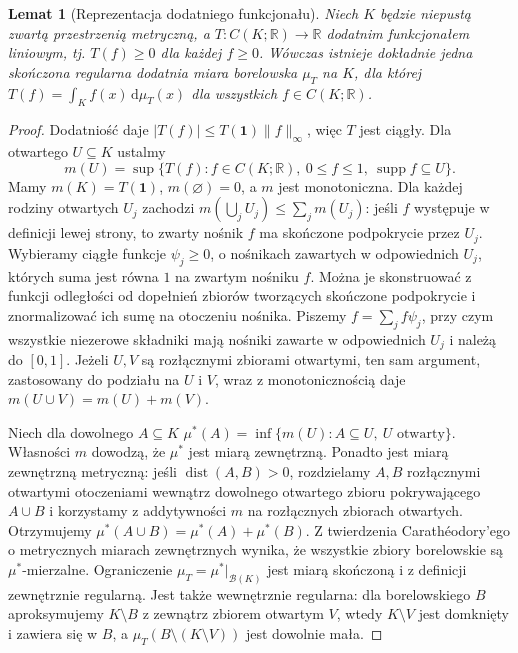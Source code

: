 \documentclass[11pt,a4paper]{article}
\numberwithin{equation}{section}
\theoremstyle{plain}
\newtheorem{lemat}[twierdzenie]{Lemat}
\theoremstyle{definition}
\theoremstyle{remark}
\newcommand{\R}{\mathbb R}
\begin{document}
\begin{lemat}[Reprezentacja dodatniego funkcjonału]
\label{lem:riesz-positive12}
Niech $K$ będzie niepustą zwartą przestrzenią metryczną,
a $T:C(K;\R)\to\R$ dodatnim funkcjonałem liniowym,
tj. $T(f)\ge0$ dla każdej $f\ge0$.
Wówczas istnieje dokładnie jedna skończona regularna dodatnia miara
borelowska $\mu_T$ na $K$, dla której
$T(f)=\int_Kf(x)\,\mathrm d\mu_T(x)$ dla wszystkich $f\in C(K;\R)$.
\end{lemat}
\begin{proof}
Dodatniość daje $|T(f)|\le T(\mathbf1)\|f\|_\infty$,
więc $T$ jest ciągły. Dla otwartego $U\subseteq K$ ustalmy
\[
 m(U)=\sup\{T(f):f\in C(K;\R),\ 0\le f\le1,
 \ \operatorname{supp}f\subseteq U\}.
\]
Mamy $m(K)=T(\mathbf1)$, $m(\varnothing)=0$, a $m$
jest monotoniczna. Dla każdej rodziny otwartych
$U_j$ zachodzi $m(\bigcup_jU_j)\le\sum_jm(U_j)$:
jeśli $f$ występuje w definicji lewej strony,
to zwarty nośnik $f$ ma skończone podpokrycie przez $U_j$.
Wybieramy ciągłe funkcje $\psi_j\ge0$, o nośnikach zawartych
w odpowiednich $U_j$, których suma jest równa $1$
na zwartym nośniku $f$. Można je skonstruować z funkcji
odległości od dopełnień zbiorów tworzących skończone
podpokrycie i znormalizować ich sumę na otoczeniu nośnika. Piszemy
$f=\sum_jf\psi_j$, przy czym wszystkie niezerowe składniki
mają nośniki zawarte w odpowiednich $U_j$ i należą do $[0,1]$.
Jeżeli $U,V$ są rozłącznymi zbiorami otwartymi, ten sam
argument, zastosowany do podziału na $U$ i $V$, wraz z
monotonicznością daje $m(U\cup V)=m(U)+m(V)$.

Niech dla dowolnego $A\subseteq K$
$\mu^*(A)=\inf\{m(U):A\subseteq U,\ U\text{ otwarty}\}$.
Własności $m$ dowodzą, że $\mu^*$ jest miarą zewnętrzną.
Ponadto jest miarą zewnętrzną metryczną: jeśli
$\operatorname{dist}(A,B)>0$, rozdzielamy $A,B$ rozłącznymi
otwartymi otoczeniami wewnątrz dowolnego otwartego
zbioru pokrywającego $A\cup B$ i korzystamy z addytywności
$m$ na rozłącznych zbiorach otwartych. Otrzymujemy
$\mu^*(A\cup B)=\mu^*(A)+\mu^*(B)$.
Z twierdzenia Carath\'eodory'ego o metrycznych miarach
zewnętrznych wynika, że wszystkie zbiory borelowskie są
$\mu^*$-mierzalne. Ograniczenie $\mu_T=\mu^*|_{\mathcal B(K)}$
jest miarą skończoną i z definicji zewnętrznie regularną.
Jest także wewnętrznie regularna: dla borelowskiego $B$
aproksymujemy $K\setminus B$ z zewnątrz zbiorem otwartym
$V$, wtedy $K\setminus V$ jest domknięty i zawiera się w $B$,
a $\mu_T(B\setminus(K\setminus V))$ jest dowolnie mała.


\end{proof}
\end{document}
